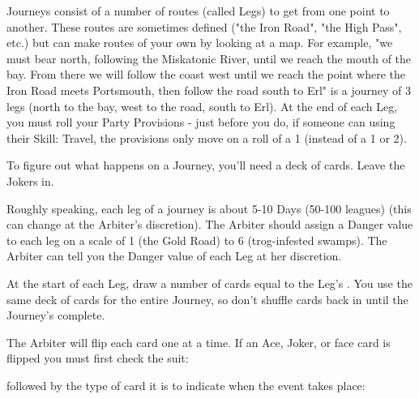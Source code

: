 

Journeys consist of a number of routes (called Legs) to get from one point to another.  These routes are sometimes defined ("the Iron Road", "the High Pass", etc.) but can make routes of your own by looking at a map.  For example, "we must bear north, following the Miskatonic River, until we reach the mouth of the bay.  From there we will follow the coast west until we reach the point where the Iron Road meets Portsmouth, then follow the road south to Erl" is a journey of 3 legs (north to the bay, west to the road, south to Erl).  At the end of each Leg, you must roll your Party Provisions \UD - just before you do, if someone can \RO using their Skill: Travel, the provisions only move \DCDOWN on a roll of a 1 (instead of a 1 or 2).

To figure out what happens on a Journey, you'll need a deck of cards.  Leave the Jokers in.


Roughly speaking, each leg of a journey is about 5-10 Days (50-100 leagues) (this can change at the Arbiter's discretion).  The Arbiter should assign a Danger value to each leg on a scale of 1 (the Gold Road) to 6 (trog-infested swamps).  The Arbiter can tell you the Danger value of each Leg at her discretion. 


At the start of each Leg, draw a number of cards equal to the Leg's . You use the same deck of cards for the entire Journey, so don't shuffle cards back in until the Journey's complete. 

\cbreak

The Arbiter will flip each card one at a time. If an Ace, Joker, or face card is flipped you must first check the suit:


  followed by the type of card it is to indicate when the event takes place:



